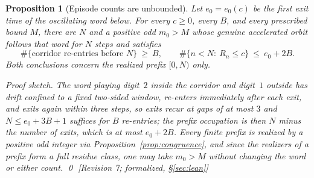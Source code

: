 \documentclass[11pt]{article}
\theoremstyle{plain}
\newtheorem{proposition}[theorem]{Proposition}
\theoremstyle{definition}
\theoremstyle{remark}
\newcommand{\status}[1]{\textsf{\footnotesize[#1]}}
\begin{document}
\begin{proposition}[Episode counts are unbounded]\label{prop:episodes}
Let $e_0=e_0(c)$ be the first exit time of the oscillating word below. For every $c\ge0$, every
$B$, and every prescribed bound $M$, there are $N$ and a positive odd $m_0>M$ whose genuine
accelerated orbit follows that word for $N$ steps and satisfies
\[
\#\{\text{corridor re-entries before }N\}\ \ge\ B,
\qquad
\#\{n<N:\ R_n\le c\}\ \le\ e_0+2B .
\]
Both conclusions concern the realized prefix $[0,N)$ only.

\emph{Proof sketch.} The word playing digit~$2$ inside the corridor and digit~$1$ outside has
drift confined to a fixed two-sided window, re-enters immediately after each exit, and exits again
within three steps, so exits recur at gaps of at most $3$ and $N\le e_0+3B+1$ suffices for $B$
re-entries; the prefix occupation is then $N$ minus the number of exits, which is at most
$e_0+2B$. Every finite prefix is realized by a positive odd integer via
Proposition~\ref{prop:congruence}, and since the realizers of a prefix form a full residue class,
one may take $m_0>M$ without changing the word or either count. \qed
\status{Revision 7; formalized, \S\ref{sec:lean}}
\end{proposition}
\end{document}
